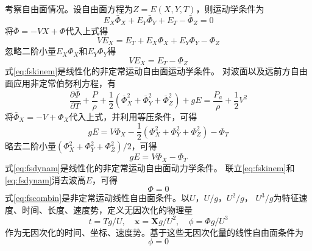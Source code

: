 考察自由面情况。设自由面方程为$Z=E(X,Y,T)$，则运动学条件为
\begin{equation*}
  E_X\bar{\Phi}_X+E_Y\bar{\Phi}_Y+E_T-\bar{\Phi}_Z=0
\end{equation*}
将$\bar{\Phi}=-VX+\Phi$代入上式得
\begin{equation*}
  VE_X=E_T+E_X\Phi_X+E_Y\Phi_Y-\Phi_Z
\end{equation*}
忽略二阶小量$E_X\Phi_X$和$E_Y\Phi_Y$得
\begin{equation}
  VE_X=E_T-\Phi_Z
  \label{eq:fskinem}
\end{equation}
式\eqref{eq:fskinem}是线性化的非定常运动自由面运动学条件。
对波面以及远前方自由面应用非定常伯努利方程，有
\begin{equation*}
  \frac{\partial\bar{\Phi}}{\partial T}+\frac{P}{\rho}+\frac{1}{2}(\bar{\Phi}_X^2
  +\bar{\Phi}_Y^2+\bar{\Phi}_Z^2)+gE
  =\frac{P_a}{\rho}+\frac{1}{2}V^2
\end{equation*}
将$\bar{\Phi}_X=-V+\Phi_X$代入上式，并利用等压条件，可得
\begin{equation*}
  gE=V\Phi_X-\frac{1}{2}(\Phi_X^2+\Phi_Y^2+\Phi_Z^2)-\Phi_T
\end{equation*}
略去二阶小量$(\Phi_X^2+\Phi_Y^2+\Phi_Z^2)/2$，可得
\begin{equation}
  gE=V\Phi_X-\Phi_T
  \label{eq:fsdynam}
\end{equation}
式\eqref{eq:fsdynam}是线性化的非定常运动自由面动力学条件。
联立\eqref{eq:fskinem}和\eqref{eq:fsdynam}消去波高$E$，可得
\begin{equation}
  [g\partial_Z+(V\partial_X-\partial_T)^2]\Phi=0
  \label{eq:fscombin}
\end{equation}
式\eqref{eq:fscombin}是非定常运动线性自由面条件。以$U$，$U/g$，$U^2/g$，
$U^3/g$为特征速度、时间、长度、速度势，定义无因次化的物理量
\begin{equation*}
  t=Tg/U,\quad\mathbf{x}=\mathbf{X}g/U^2,\quad\phi=\Phi g/U^3
\end{equation*}
作为无因次化的时间、坐标、速度势。基于这些无因次化量的线性自由面条件为
%
\begin{equation}
  [\partial_z+(\partial_x-\partial_t)^2]\phi=0
  \label{eq:fsnondim}
\end{equation}

